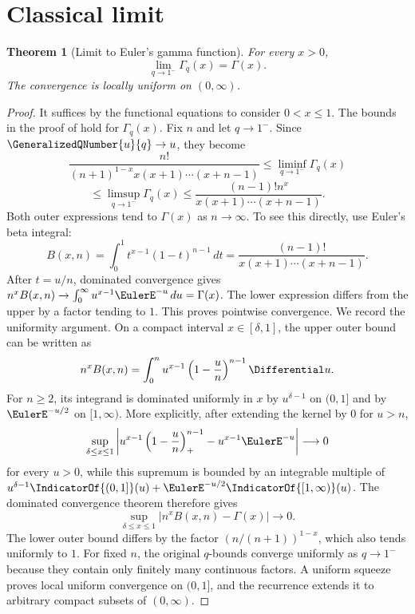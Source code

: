 \documentclass[11pt,a4paper,oneside,openany]{book}
\newtheorem{theorem}{Theorem}[chapter]
\theoremstyle{definition}
\theoremstyle{remark}
\begin{document}
\section{Classical limit}

\begin{theorem}[Limit to Euler's gamma function]\label{thm:qgamma-classical-limit}
For every $x>0$,
\[
 \lim_{q\to1^-}\Gamma_q(x)=\Gamma(x).
\]
The convergence is locally uniform on $(0,\infty)$.
\end{theorem}

\begin{proof}
It suffices by the functional equations to consider $0<x\le1$.  The bounds in the proof of  hold for $\Gamma_q(x)$.  Fix $n$ and let $q\to1^-$.  Since $\GeneralizedQNumber{u}{q}\to u$, they become
\[
 \frac{n!}{(n+1)^{1-x}x(x+1)\cdots(x+n-1)}
 \le \liminf_{q\to1^-}\Gamma_q(x)
\]
\[
 \le\limsup_{q\to1^-}\Gamma_q(x)
 \le\frac{(n-1)!n^x}{x(x+1)\cdots(x+n-1)}.
\]
Both outer expressions tend to $\Gamma(x)$ as $n\to\infty$.  To see this directly, use Euler's beta integral:
\[
 B(x,n)=\int_0^1t^{x-1}(1-t)^{n-1}\,dt
 =\frac{(n-1)!}{x(x+1)\cdots(x+n-1)}.
\]
After $t=u/n$, dominated convergence gives $n^xB(x,n)\to\int_0^\infty u^{x-1}\EulerE^{-u}\,du=\Gamma(x)$.  The lower expression differs from the upper by a factor tending to $1$.  This proves pointwise convergence.  We record the uniformity argument.  On a compact interval $x\in[\delta,1]$, the upper outer bound can be written as
\[
 n^xB(x,n)=\int_0^n u^{x-1}\left(1-\frac un\right)^{n-1}\Differential u.
\]
For $n\ge2$, its integrand is dominated uniformly in $x$ by $u^{\delta-1}$ on $(0,1]$ and by $\EulerE^{-u/2}$ on $[1,\infty)$.  More explicitly, after extending the kernel by $0$ for $u>n$,
\[
 \sup_{\delta\le x\le1}
 \left|u^{x-1}\left(1-\frac un\right)_{+}^{n-1}
       -u^{x-1}\EulerE^{-u}\right|
 \longrightarrow0
\]
for every $u>0$, while this supremum is bounded by an integrable
multiple of $u^{\delta-1}\IndicatorOf{(0,1]}(u)+\EulerE^{-u/2}\IndicatorOf{[1,\infty)}(u)$.
The dominated convergence theorem therefore gives
\[
 \sup_{\delta\le x\le1}
 \left|n^xB(x,n)-\Gamma(x)\right|\longrightarrow0.
\]
The lower outer bound differs by the factor $(n/(n+1))^{1-x}$, which also tends uniformly to $1$.  For fixed $n$, the original $q$-bounds converge uniformly as $q\to1^-$ because they contain only finitely many continuous factors.  A uniform squeeze proves local uniform convergence on $(0,1]$, and the recurrence extends it to arbitrary compact subsets of $(0,\infty)$.
\end{proof}
\end{document}
